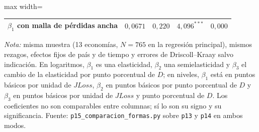 \begin{table}[htbp]
\begin{adjustbox}{max width=\linewidth}
\begin{tabular}{lcccc}
\quad $\beta_1$ con malla de pérdidas ancha & $0{,}0671$ & $0{,}220$ & $4{,}096^{***}$ & $0{,}000$ \\
\bottomrule
\end{tabular}
\end{adjustbox}
\par\smallskip\parbox{0.95\linewidth}{\scriptsize \textit{Nota:} misma muestra (13 economías, $N=765$ en la regresión principal), mismos rezagos, efectos fijos de país y de tiempo y errores de Driscoll--Kraay salvo indicación. En logaritmos, $\beta_1$ es una elasticidad, $\beta_2$ una semielasticidad y $\beta_3$ el cambio de la elasticidad por punto porcentual de $D$; en niveles, $\beta_1$ está en puntos básicos por unidad de $JLoss$, $\beta_2$ en puntos básicos por punto porcentual de $D$ y $\beta_3$ en puntos básicos por unidad de $JLoss$ y punto porcentual de $D$. Los coeficientes no son comparables entre columnas; sí lo son su signo y su significancia. Fuente: \texttt{p15\_comparacion\_formas.py} sobre \texttt{p13} y \texttt{p14} en ambos modos.}
\end{table}
